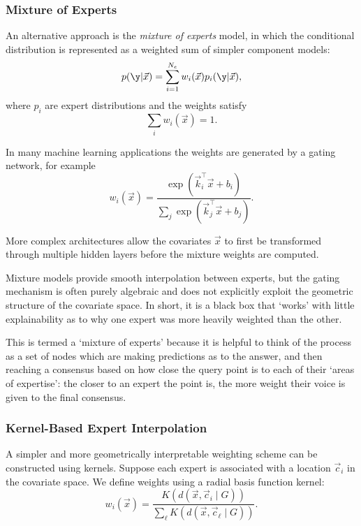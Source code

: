 		\subsubsection{Mixture of Experts}

			An alternative approach is the \emph{mixture of experts} model, in which the conditional distribution is represented as a weighted sum of simpler component models:
			\begin{equation}
				p(\y|\vec{x}) =
				\sum_{i=1}^{N_e} w_i(\vec{x}) p_i(\y|\vec{x}),
			\end{equation}
			where $p_i$ are expert distributions and the weights satisfy
			\begin{equation}
				\sum_i w_i(\vec{x}) = 1.
			\end{equation}

			In many machine learning applications the weights are generated by a gating network, for example
			\begin{equation}
				w_i(\vec{x}) =
				\frac{\exp(\vec{k}_i^\intercal \vec{x}+b_i)}
				{\sum_j \exp(\vec{k}_j^\intercal \vec{x}+b_j)}.
			\end{equation}

			More complex architectures allow the covariates $\vec{x}$ to first be transformed through multiple hidden layers before the mixture weights are computed.

			Mixture models provide smooth interpolation between experts, but the gating mechanism is often purely algebraic and does not explicitly exploit the geometric structure of the covariate space. In short, it is a black box that `works' with little explainability as to why one expert was more heavily weighted than the other.

			\begin{analogy}
				This is termed a `mixture of experts' because it is helpful to think of the process as a set of nodes which are making predictions as to the answer, and then reaching a consensus based on how close the query point is to each of their `areas of expertise': the closer to an expert the point is, the more weight their voice is given to the final consensus.
			\end{analogy}
		\subsubsection{Kernel-Based Expert Interpolation}

			A simpler and more geometrically interpretable weighting scheme can be constructed using kernels.
			Suppose each expert is associated with a location $\vec{c}_i$ in the covariate space.
			We define weights using a radial basis function kernel:
			\begin{equation}
				w_i(\vec{x}) =
				\frac{K\!\left(d(\vec{x},\vec{c}_i \mid G)\right)}
				{\sum_{\ell} K\!\left(d(\vec{x},\vec{c}_\ell \mid G)\right)}.
			\end{equation}

